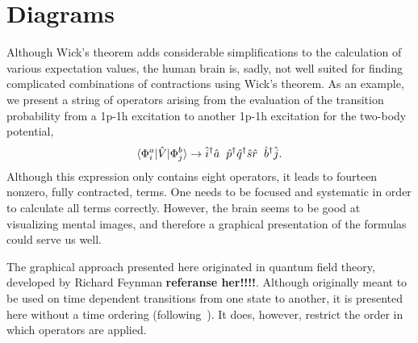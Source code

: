 \section{Diagrams}
Although Wick's theorem adds considerable simplifications to the calculation of various expectation values, the human brain is, sadly, not well suited for finding complicated combinations of
contractions using Wick's theorem.
As an example, we present a string of operators
arising from the evaluation of the transition probability from a 1p-1h excitation
to another 1p-1h excitation for the two-body potential, 
\begin{equation}
\label{eq:manybody:example}
\langle \Phi_i^a | \hat{V} | \Phi_j^b \rangle
\rightarrow
\hat{i}^{\dagger} \hat{a} \hspace{2mm} \hat{p}^{\dagger} \hat{q}^{\dagger}
\hat{s} \hat{r} \hspace{2mm} \hat{b}^{\dagger} \hat{j} .
\end{equation}
Although this expression only contains eight operators, it leads to fourteen nonzero,
fully contracted, terms.
One needs to be focused and systematic in order to calculate all terms correctly.
However, the brain seems to be good at visualizing mental images, and therefore a
graphical presentation of the formulas could serve us well.

The graphical approach presented here originated in quantum field theory,
developed by Richard Feynman {\bf referanse her!!!!}.
Although originally meant to be used on time dependent transitions from one
state to another, it is presented here without a time ordering (following~\cite{shavitt2009many}).
It does, however, restrict the order in which operators are applied.

